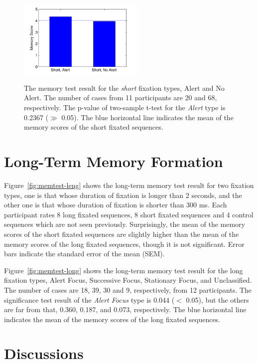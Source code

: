 \documentclass[10pt,letterpaper]{article}
\begin{document}
\begin{figure}
  \centerline{\includegraphics[width=60mm,height=44mm,trim=9mm 3mm 12mm 3mm]{./eps/memtest_short.pdf}}
  \caption{The memory test result for the \textit{short} fixation types, Alert and No Alert. The number of cases from 11 participants are 20 and 68, respectively. The p-value of two-sample t-test for the \textit{Alert} type is 0.2367 ($\gg$ 0.05). The blue horizontal line indicates the mean of the memory scores of the short fixated sequences.}
  \label{fig:memtest-short}
\end{figure}


\section{Long-Term Memory Formation}

Figure~\ref{fig:memtest-leng} shows the long-term memory test result for two fixation types, one is that whose duration of fixation is longer than 2 seconds, and the other one is that whose duration of fixation is shorter than 300 ms. Each participant rates 8 long fixated sequences, 8 short fixated sequences and 4 control sequences which are not seen previously. Surprisingly, the mean of the memory scores of the short fixated sequences are slightly higher than the mean of the memory scores of the long fixated sequences, though it is not significant. Error bars indicate the standard error of the mean (SEM).

Figure~\ref{fig:memtest-long} shows the long-term memory test result for the long fixation types, Alert Focus, Successive Focus, Stationary Focus, and Unclassified. The number of cases are 18, 39, 30 and 9, respectively, from 12 participants. The significance test result of the \textit{Alert Focus} type is 0.044 ($<$ 0.05), but the others are far from that, 0.360, 0.187, and 0.073, respectively. The blue horizontal line indicates the mean of the memory scores of the long fixated sequences.


\section{Discussions}
\end{document}
